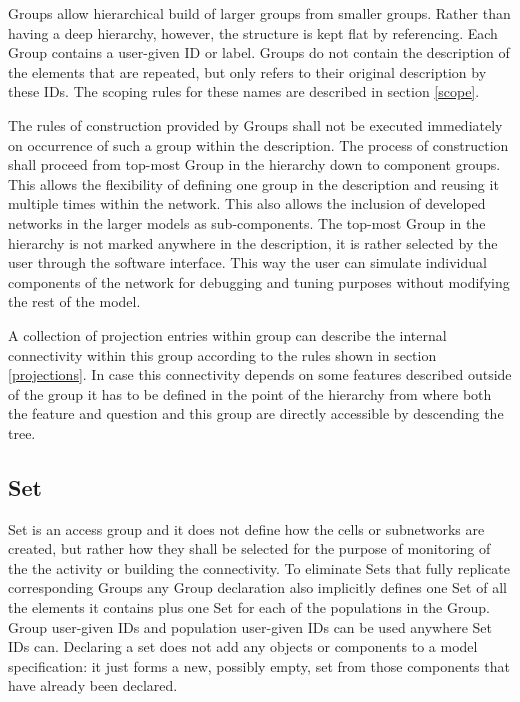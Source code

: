 \documentclass{article}
\begin{document}
Groups allow hierarchical build of larger groups from smaller groups. Rather
than having a deep hierarchy, however, the structure is kept flat by
referencing. Each Group contains a user-given ID or label. Groups do not
contain the description of the elements that are repeated, but only refers
to their original description by these IDs. The scoping rules for these names
are described in section \ref{scope}.

The rules of construction provided by Groups shall not be
executed immediately on occurrence of such a group within the description.
The process of construction shall proceed from top-most Group in the hierarchy
down to component groups. This allows the flexibility of defining one
group in the description and reusing it multiple times within the network.
This also allows the inclusion of developed networks in the larger models
as sub-components. The top-most Group in the hierarchy is not marked anywhere
in the description, it is rather selected by the user through the software
interface. This way the user can simulate individual components of the network
for debugging and tuning purposes without modifying the rest of the model.

A collection of projection entries within group can describe the internal
connectivity within this group according to the rules shown in section
\ref{projections}. In case this connectivity depends on some features
described outside of the group it has to be defined in the point of the
hierarchy from where both the feature and question and this group are
directly accessible by descending the tree.

\subsection{Set}
\label{accessGroup}

Set is an access group and it does not define how the cells or subnetworks
are created, but rather how they shall be selected for the purpose of
monitoring of the the activity or building the connectivity. To eliminate
Sets that fully replicate corresponding Groups any Group
declaration also implicitly defines one Set of all the elements it contains
plus one Set for each of the populations in the Group. Group user-given IDs
and population user-given IDs can be used anywhere Set IDs can.
Declaring a set does not add any objects or components to a model
specification: it just forms a new, possibly empty, set from those
components that have already been declared.
\end{document}
